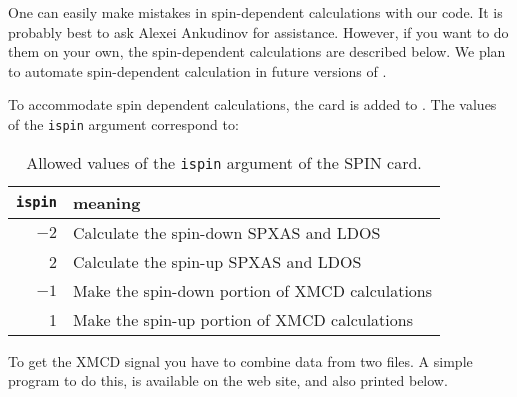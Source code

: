 \documentclass[11pt,oneside]{report} %
\begin{document}
One can easily make mistakes in spin-dependent calculations with our code.
It is probably best to ask Alexei Ankudinov for assistance. However, if you
want to do them on your own, the spin-dependent calculations are described
below. We plan to automate spin-dependent calculation in future
versions of {\feff}.

To accommodate spin dependent calculations, the 
card is added to {\feff}.  The values of the \texttt{ispin}
argument correspond to:

\begin{table}[htbp]
  \begin{center}
    \begin{tabular}[h]{rl}
      \hline\hline
      \texttt{ispin} & \quad meaning \\
      \hline
      $-2$ & Calculate the spin-down SPXAS and LDOS\\
      2    & Calculate the spin-up SPXAS and LDOS\\
      $-1$ & Make the spin-down portion of XMCD calculations \\
      1    & Make the spin-up portion of XMCD calculations \\
      \hline\hline
    \end{tabular}
    \caption{Allowed values of the \texttt{ispin} argument of the SPIN card.}
    \label{tab:spin}
  \end{center}
\end{table}

To get the XMCD signal you have to combine data from two 
files. A simple program to do this,  is available on the
{\feff} web site, and also printed below.
\end{document}
